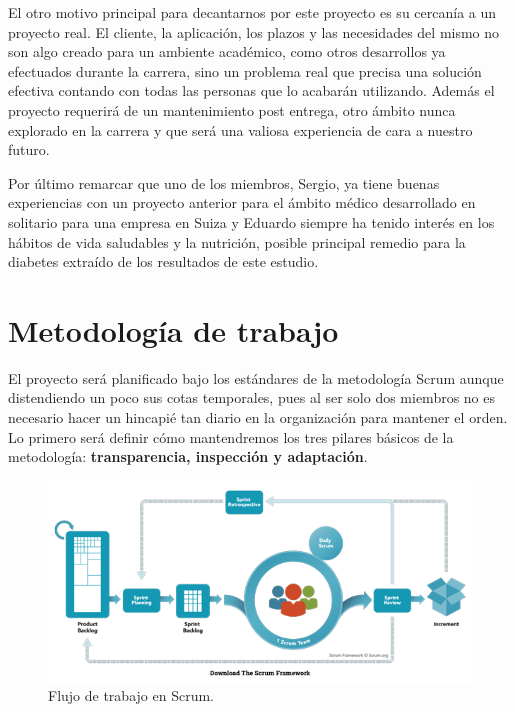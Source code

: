 	El otro motivo principal para decantarnos por este proyecto es su cercanía a un proyecto real. El cliente, la aplicación, los plazos y las necesidades del mismo no son algo creado para un ambiente académico, como otros desarrollos ya efectuados durante la carrera, sino un problema real que precisa una solución efectiva contando con todas las personas que lo acabarán utilizando. Además el proyecto requerirá de un mantenimiento post entrega, otro ámbito nunca explorado en la carrera y que será una valiosa experiencia de cara a nuestro futuro.\newline

	Por último remarcar que uno de los miembros, Sergio, ya tiene buenas experiencias con un proyecto anterior para el ámbito médico desarrollado en solitario para una empresa en Suiza y Eduardo siempre ha tenido interés en los hábitos de vida saludables y la nutrición, posible principal remedio para la diabetes extraído de los resultados de este estudio.\newpage
	
	\section{Metodología de trabajo}
    
    El proyecto será planificado bajo los estándares de la metodología Scrum\cite{Scrum} aunque distendiendo un poco sus cotas temporales, pues al ser solo dos miembros no es necesario hacer un hincapié tan diario en la organización para mantener el orden. Lo primero será definir cómo mantendremos los tres pilares básicos de la metodología: \textbf{transparencia, inspección y adaptación}.
    
    \begin{figure}[h]
    \centering
     \includegraphics[width=1\textwidth]{images/Scrum.png}
    \caption{Flujo de trabajo en Scrum.}
    \end{figure}
    

